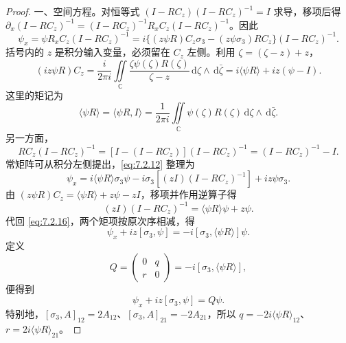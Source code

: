 \documentclass[lang=cn,scheme=chinese,mode=simple,device=normal,color=blue,math=cm,thmcnt=section,12pt]{elegantbook}
\newcommand{\dd}{\,\mathrm{d}}
\newcommand{\eqq}[2]{\tag{#1}\label{eq:#1}#2}
\begin{document}
\begin{proof}
{\heiti 一、空间方程。}对恒等式 $(I-RC_z)(I-RC_z)^{-1}=I$ 求导，移项后得
$\partial_x(I-RC_z)^{-1}=(I-RC_z)^{-1}R_xC_z(I-RC_z)^{-1}$。因此
\begin{equation}
\eqq{7.2.12}{\psi_x=\psi R_xC_z(I-RC_z)^{-1}
=i\{(z\psi R)C_z\sigma_3-(z\psi\sigma_3)RC_z\}(I-RC_z)^{-1}.}
\end{equation}
括号内的 $z$ 是积分输入变量，必须留在 $C_z$ 左侧。利用 $\zeta=(\zeta-z)+z$，
\begin{equation}
\eqq{7.2.13}{(iz\psi R)C_z=\dfrac{i}{2\pi i}\iint\limits_{\mathbb C}
\dfrac{\zeta\psi(\zeta)R(\zeta)}{\zeta-z}\dd\zeta\wedge\dd\bar\zeta
=i\langle\psi R\rangle+iz(\psi-I).}
\end{equation}
这里的矩记为
\begin{equation}
\eqq{7.2.14}{\langle\psi R\rangle=\langle\psi R,I\rangle
=\dfrac{1}{2\pi i}\iint\limits_{\mathbb C}\psi(\zeta)R(\zeta)\dd\zeta\wedge\dd\bar\zeta.}
\end{equation}
另一方面，
\begin{equation}
\eqq{7.2.15}{RC_z(I-RC_z)^{-1}=[I-(I-RC_z)](I-RC_z)^{-1}=(I-RC_z)^{-1}-I.}
\end{equation}
常矩阵可从积分左侧提出，\eqref{eq:7.2.12} 整理为
\begin{equation}
\eqq{7.2.16}{\psi_x=i\langle\psi R\rangle\sigma_3\psi-i\sigma_3[(zI)(I-RC_z)^{-1}]+iz\psi\sigma_3.}
\end{equation}
由 $(z\psi R)C_z=\langle\psi R\rangle+z\psi-zI$，移项并作用逆算子得
\begin{equation}
\eqq{7.2.17}{(zI)(I-RC_z)^{-1}=\langle\psi R\rangle\psi+z\psi.}
\end{equation}
代回 \eqref{eq:7.2.16}，两个矩项按原次序相减，得
\begin{equation}
\eqq{7.2.18}{\psi_x+iz[\sigma_3,\psi]=-i[\sigma_3,\langle\psi R\rangle]\psi.}
\end{equation}
定义
\begin{equation}
\eqq{7.2.19}{Q=\begin{pmatrix}0&q\\r&0\end{pmatrix}=-i[\sigma_3,\langle\psi R\rangle],}
\end{equation}
便得到
\begin{equation}
\eqq{7.2.20}{\psi_x+iz[\sigma_3,\psi]=Q\psi.}
\end{equation}
特别地，$[\sigma_3,A]_{12}=2A_{12}$、$[\sigma_3,A]_{21}=-2A_{21}$，所以 $q=-2i\langle\psi R\rangle_{12}$、$r=2i\langle\psi R\rangle_{21}$。


\end{proof}
\end{document}
